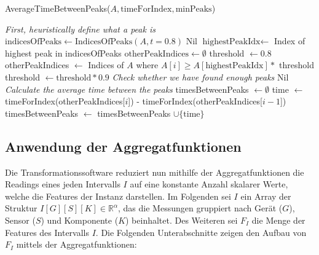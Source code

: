 \begin{algorithm}
    \caption{AverageTimeBetweenPeaks($A, \text{timeForIndex}, \text{minPeaks}$)}
    \label{algo:avgTimeBetweenPeaks}
    \begin{algorithmic}
        \State \LeftComment \textit{First, heuristically define what a peak is}
        \State $\text{indicesOfPeaks} \gets \text{IndicesOfPeaks}(A, t = 0.8)$
            \State \Return Nil
        \EndIf
        \State $\text{highestPeakIdx} \gets$ Index of highest peak in indicesOfPeaks
        \State {}
        \State $\text{otherPeakIndices} \gets \emptyset$
        \State threshold $\gets 0.8$
        \Repeat
            \State otherPeakIndices $\gets$ Indices of $A$ where $A[i] \geq A[\text{highestPeakIdx}] * $ threshold
            \State threshold $\gets \text{threshold} * 0.9$
        \State \LeftComment \textit{Check whether we have found enough peaks}
            \State \Return Nil
        \EndIf
        \State \LeftComment \textit{Calculate the average time between the peaks}
        \State timesBetweenPeaks $\gets \emptyset$
            \State time $\gets$ timeForIndex(otherPeakIndices[$i$]) - timeForIndex(otherPeakIndices[$i - 1$])
            \State timesBetweenPeaks $\gets$ timesBetweenPeaks $\cup \{\text{time}\}$
        \EndFor
        \State \Return {}
    \end{algorithmic}
\end{algorithm}

\subsection{Anwendung der Aggregatfunktionen}
Die Transformationssoftware reduziert nun mithilfe der Aggregatfunktionen die Readings eines jeden Intervalls $I$ auf eine konstante Anzahl skalarer Werte, welche die Features der Instanz darstellen. Im Folgenden sei $I$ ein Array der Struktur $I[G][S][K] \in \mathbb{R}^\alpha$, das die Messungen gruppiert nach Gerät ($G$), Sensor ($S$) und Komponente ($K$) beinhaltet. Des Weiteren sei $F_I$ die Menge der Features des Intervalls $I$. Die Folgenden Unterabschnitte zeigen den Aufbau von $F_I$ mittels der Aggregatfunktionen:
